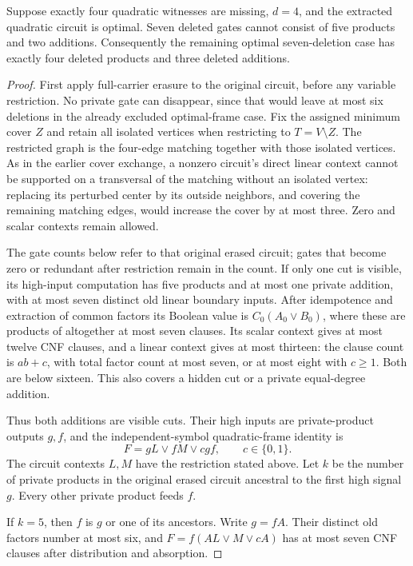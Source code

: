 \begin{proposition}\label{prop:fiveproductseven}
Suppose exactly four quadratic witnesses are missing, $d=4$, and the extracted quadratic circuit is optimal. Seven deleted gates cannot consist of five products and two additions. Consequently the remaining optimal seven-deletion case has exactly four deleted products and three deleted additions.
\end{proposition}
\begin{proof}
First apply full-carrier erasure to the original circuit, before any variable restriction. No private gate can disappear, since that would leave at most six deletions in the already excluded optimal-frame case. Fix the assigned minimum cover $Z$ and retain all isolated vertices when restricting to $T=V\setminus Z$. The restricted graph is the four-edge matching together with those isolated vertices. As in the earlier cover exchange, a nonzero circuit's direct linear context cannot be supported on a transversal of the matching without an isolated vertex: replacing its perturbed center by its outside neighbors, and covering the remaining matching edges, would increase the cover by at most three. Zero and scalar contexts remain allowed.

The gate counts below refer to that original erased circuit; gates that become zero or redundant after restriction remain in the count. If only one cut is visible, its high-input computation has five products and at most one private addition, with at most seven distinct old linear boundary inputs. After idempotence and extraction of common factors its Boolean value is $C_0(A_0\vee B_0)$, where these are products of altogether at most seven clauses. Its scalar context gives at most twelve CNF clauses, and a linear context gives at most thirteen: the clause count is $ab+c$, with total factor count at most seven, or at most eight with $c\geq1$. Both are below sixteen. This also covers a hidden cut or a private equal-degree addition.

Thus both additions are visible cuts. Their high inputs are private-product outputs $g,f$, and the independent-symbol quadratic-frame identity is
\[
 F=gL\vee fM\vee cgf,\qquad c\in\{0,1\}.
\]
The circuit contexts $L,M$ have the restriction stated above. Let $k$ be the number of private products in the original erased circuit ancestral to the first high signal $g$. Every other private product feeds $f$.

If $k=5$, then $f$ is $g$ or one of its ancestors. Write $g=fA$. Their distinct old factors number at most six, and $F=f(AL\vee M\vee cA)$ has at most seven CNF clauses after distribution and absorption.


\end{proof}
